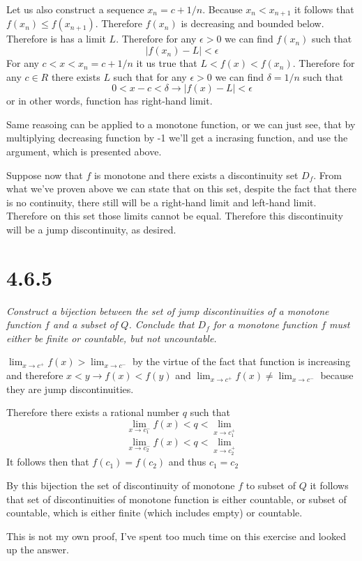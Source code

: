 \documentclass[11pt,oneside,titlepage]{book}
\begin{document}
Let us also construct a sequence $x_n = c + 1/n$. Because $x_n < x_{n + 1}$
it follows that $f(x_n) \leq f(x_{n + 1})$. Therefore $f(x_n)$ is decreasing
and bounded below. Therefore is has a limit $L$. Therefore for any
$\epsilon > 0$ we can find $f(x_n)$ such that
$$|f(x_n) - L| < \epsilon$$
For any  $c < x < x_n = c  + 1/n$ it us true that $L < f(x) < f(x_n)$.
Therefore for any $c \in R$ there exists $L$ such that
for any $\epsilon > 0$  we can find $\delta = 1/n$ such that
$$0 < x - c < \delta \to |f(x) - L| < \epsilon$$
or in other words, function has right-hand limit.

Same reasoing can be applied to a monotone function, or we can just see, that
by multiplying decreasing function by -1 we'll get a incrasing function, and
use the argument, which is presented above.

Suppose now that $f$ is monotone and there exists a discontinuity set $D_f$.
From what we've proven above we can state that on this set, despite the
fact that there is no continuity, there still will be a right-hand limit
and left-hand limit. Therefore on this set those limits cannot be equal.
Therefore this discontinuity will be a jump discontinuity, as desired.

\section*{4.6.5}
\textit{Construct a bijection between the set of jump discontinuities of a
  monotone function $f$ and a subset of $Q$. Conclude that $D_f$ for a monotone
  function $f$ must  either be finite or countable, but not uncountable.}

$\lim_{x \to c^+} f(x) > \lim_{x \to c^-}$ by the virtue
of the fact that function is increasing and therefore $x < y \to f(x) < f(y)$
and $\lim_{x \to c^+} f(x) \neq \lim_{x \to c^-}$  because they are jump
discontinuities.

Therefore there exists a rational number $q$ such that
$$\lim_{x \to c_1^-} f(x) < q < \lim_{x \to c_1^+}$$
$$\lim_{x \to c_2^-} f(x) < q < \lim_{x \to c_2^+}$$
It follows then that $f(c_1) = f(c_2)$ and thus $c_1 = c_2$

By this bijection the set of discontinuity of monotone $f$ to subset of  $Q$
it follows that set of discontinuities of monotone function is either
countable, or subset of countable, which is either
finite (which includes empty) or countable.

This is not my own proof, I've spent too much time on this exercise and looked
up the answer.
\end{document}
